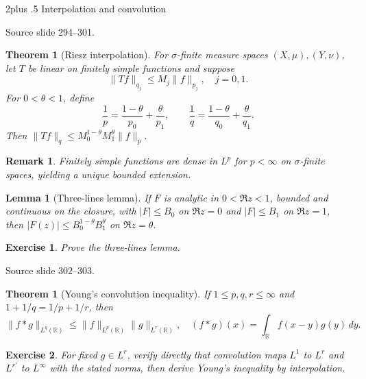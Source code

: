\documentclass[10pt,letterpaper,twoside,openright]{amsbook}
\makeatletter
\numberwithin{equation}{subsection}
\renewcommand{\section}{\@startsection{section}{1}
 {\z@}{2\baselineskip plus .5\baselineskip}
 {\baselineskip}{\normalfont\Large\bfseries\centering}}
\theoremstyle{sea-plain}
\newtheorem{theorem}[subsection]{Theorem}
\newtheorem{lemma}[subsection]{Lemma}
\theoremstyle{sea-definition}
\newtheorem{remark}[subsection]{Remark}
\theoremstyle{sea-exercise}
\newtheorem{exercise}{Exercise}[section]
\newcommand{\RR}{\mathbb{R}}
\newcommand{\src}[1]{\par\smallskip\noindent
 {\scriptsize\sffamily\color{SoftWhite}Source slide #1.}\par\nopagebreak\smallskip}
\makeatother
\begin{document}
\section{Interpolation and convolution}
\src{294--301}
\begin{theorem}[Riesz interpolation]
For $\sigma$-finite measure spaces $(X,\mu),(Y,\nu)$, let $T$ be linear
on finitely simple functions and suppose
\[
\|Tf\|_{q_j}\le M_j\|f\|_{p_j},\quad j=0,1.
\]
For $0<\theta<1$, define
\[
\frac1p=\frac{1-\theta}{p_0}+\frac{\theta}{p_1},\qquad
\frac1q=\frac{1-\theta}{q_0}+\frac{\theta}{q_1}.
\]
Then $\|Tf\|_q\le M_0^{1-\theta}M_1^\theta\|f\|_p$.
\end{theorem}
\begin{remark}
Finitely simple functions are dense in $L^p$ for $p<\infty$ on
$\sigma$-finite spaces, yielding a unique bounded extension.
\end{remark}
\begin{lemma}[Three-lines lemma]
If $F$ is analytic in $0<\Re z<1$, bounded and continuous on the
closure, with $|F|\le B_0$ on $\Re z=0$ and $|F|\le B_1$ on $\Re z=1$,
then $|F(z)|\le B_0^{1-\theta}B_1^\theta$ on $\Re z=\theta$.
\end{lemma}
\begin{exercise}
Prove the three-lines lemma.
\end{exercise}
\src{302--303}
\begin{theorem}[Young's convolution inequality]
If $1\le p,q,r\le\infty$ and $1+1/q=1/p+1/r$, then
\[
\|f*g\|_{L^q(\RR)}\le\|f\|_{L^p(\RR)}\|g\|_{L^r(\RR)},
\quad
(f*g)(x)=\int_\RR f(x-y)g(y)\,dy.
\]
\end{theorem}
\begin{exercise}
For fixed $g\in L^r$, verify directly that convolution maps
$L^1$ to $L^r$ and $L^{r'}$ to $L^\infty$ with the stated norms,
then derive Young's inequality by interpolation.
\end{exercise}
\end{document}
